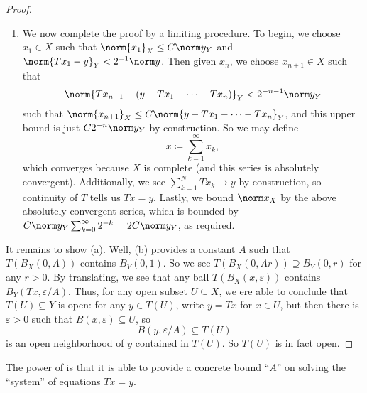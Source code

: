 \documentclass[../notes.tex]{subfiles}
\begin{document}
\begin{proof}
\begin{enumerate}
		\item We now complete the proof by a limiting procedure. To begin, we choose $x_1\in X$ such that $\norm{x_1}_X\le C\norm y_Y$ and $\norm{Tx_1-y}_Y<2^{-1}\norm y$. Then given $x_n$, we choose $x_{n+1}\in X$ such that
		\[\norm{Tx_{n+1}-(y-Tx_1-\cdots-Tx_n)}_Y<2^{-n-1}\norm y_Y\]
		such that $\norm{x_{n+1}}_X\le C\norm{y-Tx_1-\cdots-Tx_n}_Y$, and this upper bound is just $C2^{-n}\norm y_Y$ by construction. So we may define
		\[x\coloneqq\sum_{k=1}^\infty x_k,\]
		which converges because $X$ is complete (and this series is absolutely convergent). Additionally, we see $\sum_{k=1}^NTx_k\to y$ by construction, so continuity of $T$ tells us $Tx=y$. Lastly, we bound $\norm x_X$ by the above absolutely convergent series, which is bounded by $C\norm y_Y\sum_{k=0}^\infty2^{-k}=2C\norm y_Y$, as required.
	\end{enumerate}
	It remains to show (a). Well, (b) provides a constant $A$ such that $T(B_X(0,A))$ contains $B_Y(0,1)$. So we see $T(B_X(0,Ar))\supseteq B_Y(0,r)$ for any $r>0$. By translating, we see that any ball $T(B_X(x,\varepsilon))$ contains $B_Y(Tx,\varepsilon/A)$. Thus, for any open subset $U\subseteq X$, we ere able to conclude that $T(U)\subseteq Y$ is open: for any $y\in T(U)$, write $y=Tx$ for $x\in U$, but then there is $\varepsilon>0$ such that $B(x,\varepsilon)\subseteq U$, so
	\[B(y,\varepsilon/A)\subseteq T(U)\]
	is an open neighborhood of $y$ contained in $T(U)$. So $T(U)$ is in fact open.
\end{proof}
\begin{remark}
	The power of  is that it is able to provide a concrete bound ``$A$'' on solving the ``system'' of equations $Tx=y$.
\end{remark}
\end{document}
